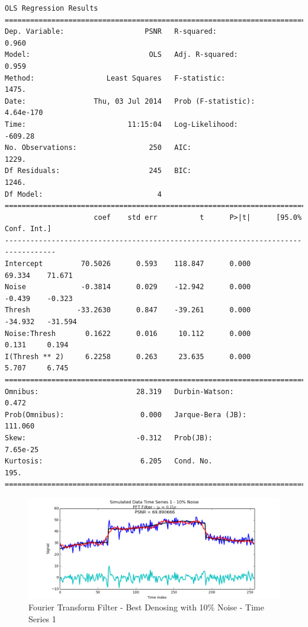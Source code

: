 \documentclass[11pt]{article}
\theoremstyle{definition}
\begin{document}
{\begin{lstlisting}[caption = Time Series 3 - FFT Coefficient Thresholding OLS Model, label = {fftfilterseries3}]
                            OLS Regression Results                            
==============================================================================
Dep. Variable:                   PSNR   R-squared:                       0.960
Model:                            OLS   Adj. R-squared:                  0.959
Method:                 Least Squares   F-statistic:                     1475.
Date:                Thu, 03 Jul 2014   Prob (F-statistic):          4.64e-170
Time:                        11:15:04   Log-Likelihood:                -609.28
No. Observations:                 250   AIC:                             1229.
Df Residuals:                     245   BIC:                             1246.
Df Model:                           4                                         
==================================================================================
                     coef    std err          t      P>|t|      [95.0% Conf. Int.]
----------------------------------------------------------------------------------
Intercept         70.5026      0.593    118.847      0.000        69.334    71.671
Noise             -0.3814      0.029    -12.942      0.000        -0.439    -0.323
Thresh           -33.2630      0.847    -39.261      0.000       -34.932   -31.594
Noise:Thresh       0.1622      0.016     10.112      0.000         0.131     0.194
I(Thresh ** 2)     6.2258      0.263     23.635      0.000         5.707     6.745
==============================================================================
Omnibus:                       28.319   Durbin-Watson:                   0.472
Prob(Omnibus):                  0.000   Jarque-Bera (JB):              111.060
Skew:                          -0.312   Prob(JB):                     7.65e-25
Kurtosis:                       6.205   Cond. No.                         195.
==============================================================================
\end{lstlisting}
}

\begin{figure}
\centering
\includegraphics[width = 0.75 \textwidth]{FFTSignal1Best.png}
\caption{Fourier Transform Filter - Best Denosing with 10\% Noise - Time Series 1}
\label{fft1best}
\end{figure}
\end{document}
